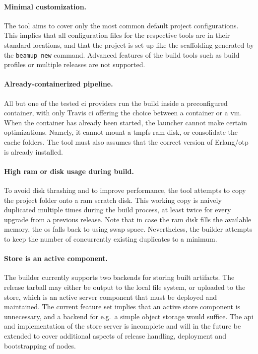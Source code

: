 \paragraph{Minimal customization.} The tool aims to cover only the most common default project configurations. This implies that all configuration files for the respective tools are in their standard locations, and that the project is set up like the scaffolding generated by the \lstinline|beamup new| command. Advanced features of the build tools such as build profiles or multiple releases are not supported.

\paragraph{Already-containerized pipeline.} All but one of the tested \acrshort{ci} providers run the build inside a preconfigured container, with only Travis \acrshort{ci} offering the choice between a container or a \acrshort{vm}. When the container has already been started, the launcher cannot make certain optimizations. Namely, it cannot mount a \acrshort{tmpfs} \acrshort{ram} disk, or consolidate the cache folders. The tool must also assumes that the correct version of Erlang/\acrshort{otp} is already installed.

\paragraph{High \acrshort{ram} or disk usage during build.}
To avoid disk thrashing and to improve performance, the tool attempts to copy the project folder onto a \acrshort{ram} scratch disk. This working copy is naively duplicated multiple times during the build process, at least twice for every upgrade from a previous release. Note that in case the \acrshort{ram} disk fills the available memory, the \acrshort{os} falls back to using swap space. Nevertheless, the builder attempts to keep the number of concurrently existing duplicates to a minimum.


\paragraph{Store is an active component.} The builder currently supports two backends for storing built artifacts. The release tarball may either be output to the local file system, or uploaded to the store, which is an active server component that must be deployed and maintained. The current feature set implies that an active store component is unnecessary, and a backend for e.g.~a simple object storage would suffice. The \acrshort{api} and implementation of the store server is incomplete and will in the future be extended to cover additional aspects of release handling, deployment and bootstrapping of nodes.

